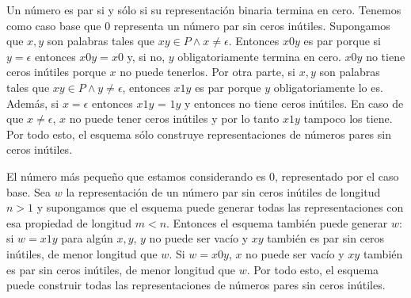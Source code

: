 \documentclass{article}
\begin{document}
Un número es par si y sólo si su representación binaria termina en cero.
Tenemos como caso base que $0$ representa un número par sin ceros inútiles.
Supongamos que $x,y$ son palabras tales que $xy \in P \wedge x \neq \epsilon$.
Entonces $x0y$ es par porque si $y = \epsilon$ entonces $x0y = x0$ y, si no,
$y$ obligatoriamente termina en cero. $x0y$ no tiene ceros inútiles porque $x$
no puede tenerlos. Por otra parte, si $x, y$ son palabras tales que
$xy \in P \wedge y \neq \epsilon$, entonces $x1y$ es par porque $y$
obligatoriamente lo es. Además, si $x = \epsilon$ entonces $x1y$ = $1y$ y
entonces no tiene ceros inútiles. En caso de que $x \neq \epsilon$, $x$ no puede
tener ceros inútiles y por lo tanto $x1y$ tampoco los tiene. Por todo esto, el
esquema sólo construye representaciones de números pares sin ceros inútiles.

El número más pequeño que estamos considerando es $0$, representado por el
caso base. Sea $w$ la representación de un número par sin ceros inútiles de
longitud $n > 1$ y supongamos que el esquema puede generar todas las
representaciones con esa propiedad de longitud $m < n$. Entonces el esquema
también puede generar $w$: si $w = x1y$ para algún $x, y$, $y$ no puede ser
vacío y $xy$ también es par sin ceros inútiles, de menor longitud que $w$. Si
$w = x0y$, $x$ no puede ser vacío y $xy$ también es par sin ceros inútiles, de
menor longitud que $w$.
Por todo esto, el esquema puede construir todas las representaciones de números
pares sin ceros inútiles.

\subsection{}

\section{}

\section{}
\end{document}
